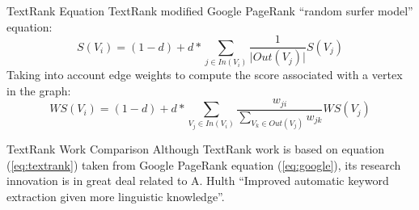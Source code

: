 \documentclass[10pt]{beamer}
\begin{document}
\begin{frame}{TextRank Equation}
\alert{TextRank} modified \alert{Google} PageRank “random surfer model” equation:
  \begin{equation}\label{eq:google}
    S(V_i) = (1 - d) + d * \sum_{j\in In(V_i)} \frac{1}{\lvert Out(V_j)\rvert}S(V_j)
  \end{equation}
Taking into account edge 
weights to compute the score associated with
a vertex in the graph:
  \begin{equation}\label{eq:textrank}
    W S(V_i) = (1 - d) + d * \sum\limits_{V_j\in In(V_i)} \frac{w_{ji}}{\sum\limits_{V_k\in Out(V_j)}w_{jk}}W S(V_j)
  \end{equation}  
\end{frame}
\begin{frame}{TextRank Work Comparison}
  Although \alert{TextRank} work is based on equation (\ref{eq:textrank}) taken from \alert{Google} PageRank equation (\ref{eq:google}), its research innovation is in great deal related to A. Hulth \cite{hulth2003improved} “Improved automatic keyword extraction given more linguistic knowledge”.
\end{frame}
\end{document}
